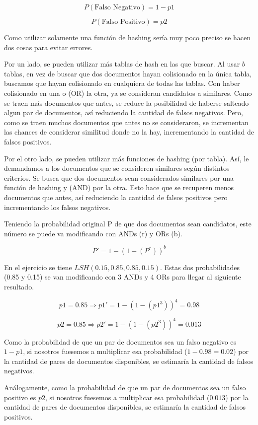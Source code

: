 \documentclass[a4paper]{article}
\begin{document}
    $$P(\text{Falso Negativo}) = 1-p1$$

    $$P(\text{Falso Positivo}) = p2$$

   Como utilizar solamente una función de hashing sería muy poco preciso se hacen dos cosas para evitar errores. 
    
    Por un lado, se pueden utilizar más tablas de hash en las que buscar. Al usar $b$ tablas, en vez de buscar que dos documentos hayan colisionado en la única tabla, buscamos que hayan colisionado en cualquiera de todas las tablas. Con haber colisionado en una o (OR) la otra, ya se consideran candidatos a similares. Como se traen más documentos que antes, se reduce la posibilidad de haberse salteado algun par de documentos, así reduciendo la cantidad de falsos negativos. Pero, como se traen muchos documentos que antes no se consideraron, se incrementan las chances de considerar similitud donde no la hay, incrementando la cantidad de falsos positivos.
    
    Por el otro lado, se pueden utilizar más funciones de hashing (por tabla). Así, le demandamos a los documentos que se consideren similares según distintos criterios. Se busca que dos documentos sean considerados similares por una función de hashing y (AND) por la otra. Esto hace que se recuperen menos documentos que antes, así reduciendo la cantidad de falsos positivos pero incrementando los falsos negativos.
    
    Teniendo la probabilidad original P de que dos documentos sean candidatos, este número se puede va modificando con ANDs (r) y ORs (b).

    $$P' = 1-(1-(P^r))^b$$

    En el ejercicio se tiene $LSH(0.15,0.85,0.85,0.15)$. Estas dos probabilidades (0.85 y 0.15) se van modificando con 3 ANDs y 4 ORs para llegar al siguiente resultado.
    
    $$p1 = 0.85 \Rightarrow p1'=1-(1-(p1^3))^4 = 0.98$$

    $$p2 = 0.85 \Rightarrow p2'=1-(1-(p2^3))^4 = 0.013$$
    
    Como la probabilidad de que un par de documentos sea un falso negativo es $1-p1$, si nosotros fuesemos a multiplicar esa probabilidad ($1-0.98=0.02$) por la cantidad de pares de documentos disponibles, se estimaría la cantidad de falsos negativos. 

    Análogamente, como la probabilidad de que un par de documentos sea un falso positivo es $p2$, si nosotros fuesemos a multiplicar esa probabilidad ($0.013$) por la cantidad de pares de documentos disponibles, se estimaría la cantidad de falsos positivos.
\end{document}
